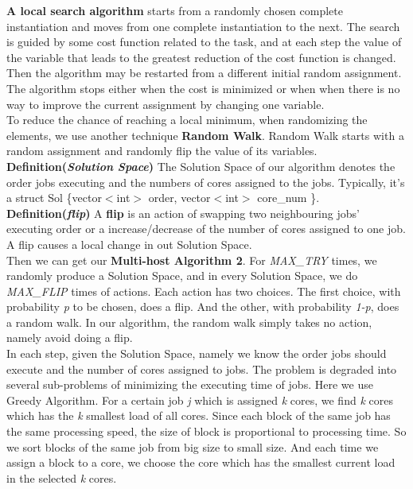 \documentclass{article}
\begin{document}
    \textbf{A local search algorithm} starts from a randomly chosen complete instantiation and moves from one complete instantiation to the next. The search is guided by some cost function related to the task, and at each step the value of the variable that leads to the greatest reduction of the cost function is changed. Then the algorithm may be restarted from a different initial random assignment. The algorithm stops either when the cost is minimized or when when there is no way to improve the current assignment by changing one variable. \\
    
    To reduce the chance of reaching a local minimum, when randomizing the elements, we use another technique \textbf{Random Walk}. Random Walk starts with a random assignment and randomly flip the value of its variables.\\
    
    \textbf{Definition(\textit{Solution Space})} The Solution Space of our algorithm denotes the order jobs executing and the numbers of cores assigned to the jobs. Typically, it's a struct Sol \{vector$<$int$>$ order, vector$<$int$>$ core\_num \}. \\
    
    \textbf{Definition(\textit{flip})} A \textbf{flip} is an action of swapping two neighbouring jobs' executing order or a increase/decrease of the number of cores assigned to one job. A flip causes a local change in out Solution Space.\\
    
    Then we can get our \textbf{Multi-host Algorithm 2}. For \textit{MAX\_TRY} times, we randomly produce a Solution Space, and in every Solution Space, we do \textit{MAX\_FLIP} times of actions. Each action has two choices. The first choice, with probability \textit{p} to be chosen, does a flip. And the other, with probability \textit{1-p}, does a random walk. In our algorithm, the random walk simply takes no action, namely avoid doing a flip. \\
    
    In each step, given the Solution Space, namely we know the order jobs should execute and the number of cores assigned to jobs. The problem is degraded into several sub-problems of minimizing the executing time of jobs. Here we use Greedy Algorithm. For a certain job \textit{j} which is assigned \textit{k} cores, we find \textit{k} cores which has the \textit{k} smallest load of all cores. Since each block of the same job has the same processing speed, the size of block is proportional to processing time. So we sort blocks of the same job from big size to small size. And each time we assign a block to a core, we choose the core which has the smallest current load in the selected \textit{k} cores.
    
\end{document}
